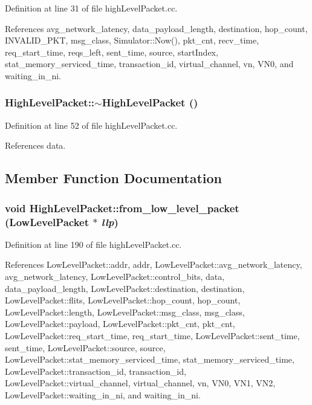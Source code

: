 Definition at line 31 of file highLevelPacket.cc.

References avg\_\-network\_\-latency, data\_\-payload\_\-length, destination, hop\_\-count, INVALID\_\-PKT, msg\_\-class, Simulator::Now(), pkt\_\-cnt, recv\_\-time, req\_\-start\_\-time, reqs\_\-left, sent\_\-time, source, startIndex, stat\_\-memory\_\-serviced\_\-time, transaction\_\-id, virtual\_\-channel, vn, VN0, and waiting\_\-in\_\-ni.
\subsubsection[{$\sim$HighLevelPacket}]{\setlength{\rightskip}{0pt plus 5cm}HighLevelPacket::$\sim$HighLevelPacket ()}\label{classHighLevelPacket_dc29e5ebbbb6e7c3b1d1a53b0ea14142}




Definition at line 52 of file highLevelPacket.cc.

References data.

\subsection{Member Function Documentation}
\subsubsection[{from\_\-low\_\-level\_\-packet}]{\setlength{\rightskip}{0pt plus 5cm}void HighLevelPacket::from\_\-low\_\-level\_\-packet ({\bf LowLevelPacket} $\ast$ {\em llp})}\label{classHighLevelPacket_6a4e25020ea0c66aab015e9c2a2c8c85}




Definition at line 190 of file highLevelPacket.cc.

References LowLevelPacket::addr, addr, LowLevelPacket::avg\_\-network\_\-latency, avg\_\-network\_\-latency, LowLevelPacket::control\_\-bits, data, data\_\-payload\_\-length, LowLevelPacket::destination, destination, LowLevelPacket::flits, LowLevelPacket::hop\_\-count, hop\_\-count, LowLevelPacket::length, LowLevelPacket::msg\_\-class, msg\_\-class, LowLevelPacket::payload, LowLevelPacket::pkt\_\-cnt, pkt\_\-cnt, LowLevelPacket::req\_\-start\_\-time, req\_\-start\_\-time, LowLevelPacket::sent\_\-time, sent\_\-time, LowLevelPacket::source, source, LowLevelPacket::stat\_\-memory\_\-serviced\_\-time, stat\_\-memory\_\-serviced\_\-time, LowLevelPacket::transaction\_\-id, transaction\_\-id, LowLevelPacket::virtual\_\-channel, virtual\_\-channel, vn, VN0, VN1, VN2, LowLevelPacket::waiting\_\-in\_\-ni, and waiting\_\-in\_\-ni.

